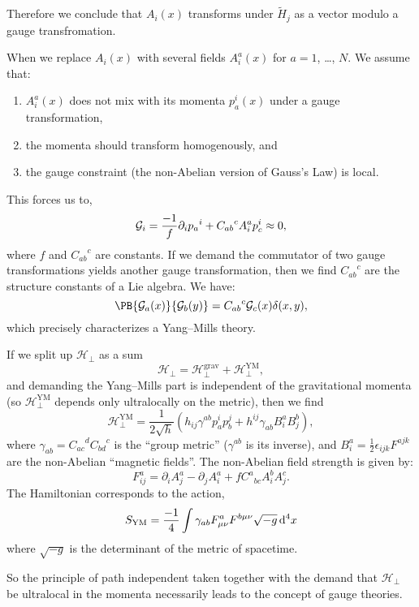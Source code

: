 \M
Therefore we conclude that $A_{i}(x)$ transforms under
$\widetilde{H}_{j}$ as a vector modulo a gauge transfromation.

When we replace $A_{i}(x)$ with several fields $A_{i}^{a}(x)$ for $a=1$,
\dots, $N$. We assume that:
\begin{enumerate} 
\item $A_{i}^{a}(x)$ does not mix with its momenta $p^{i}_{a}(x)$ under
  a gauge transformation,
\item the momenta should transform homogenously, and
\item the gauge constraint (the non-Abelian version of Gauss's Law) is local.
\end{enumerate}
This forces us to,
\begin{equation}
\mathcal{G}_{i} = \frac{-1}{f}\partial_{i}{p_{a}}^{i} + {C_{ab}}^{c}A^{a}_{i}p^{i}_{c}\approx0,
\end{equation}
where $f$ and ${C_{ab}}^{c}$ are constants. If we demand the commutator
of two gauge transformations yields another gauge transformation, then
we find ${C_{ab}}^{c}$ are the structure constants of a Lie algebra. We
have:
\begin{equation}
\PB{\mathcal{G}_{a}(x)}{\mathcal{G}_{b}(y)}={C_{ab}}^{c}\mathcal{G}_{c}(x)\delta(x,y),
\end{equation}
which precisely characterizes a Yang--Mills theory.

\M
If we split up $\mathcal{H}_{\bot}$ as a sum
\begin{equation}
\mathcal{H}_{\bot}=\mathcal{H}_{\bot}^{\text{grav}}+\mathcal{H}_{\bot}^{\text{YM}},
\end{equation}
and demanding the Yang--Mills part is independent of the gravitational
momenta (so $\mathcal{H}_{\bot}^{\text{YM}}$ depends only ultralocally
on the metric), then we find
\begin{equation}
\mathcal{H}_{\bot}^{\text{YM}} = \frac{1}{2\sqrt{h}}(h_{ij}\gamma^{ab}p^{i}_{a}p^{j}_{b}+h^{ij}\gamma_{ab}B^{a}_{i}B^{b}_{j}),
\end{equation}
where $\gamma_{ab}={C_{ac}}^{d}{C_{bd}}^{c}$ is the ``group metric''
($\gamma^{ab}$ is its inverse), and
$B^{a}_{i}=\frac{1}{2}\epsilon_{ijk}F^{ajk}$ are the non-Abelian
``magnetic fields''. The non-Abelian field strength is given by:
\begin{equation}
F^{a}_{ij}=\partial_{i}A^{a}_{j} - \partial_{j}A^{a}_{i}
+f{C^{a}}_{bc}A^{b}_{i}A^{c}_{j}.
\end{equation}
The Hamiltonian corresponds to the action,
\begin{equation}
S_{\text{YM}} = \frac{-1}{4}\int\gamma_{ab}F^{a}_{\mu\nu}F^{b\mu\nu}\sqrt{-g}\,\mathrm{d}^{4}x
\end{equation}
where $\sqrt{-g}$ is the determinant of the metric of spacetime.

\M
So the principle of path independent taken together with the demand that
$\mathcal{H}_{\bot}$ be ultralocal in the momenta necessarily leads to
the concept of gauge theories.
